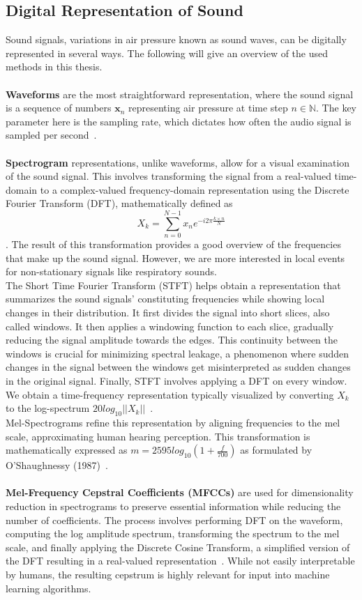 \subsection{Digital Representation of Sound}
Sound signals, variations in air pressure known as sound waves, can be digitally represented in several ways. The following will give an overview of the used methods in this thesis.\\\\
\textbf{Waveforms} are the most straightforward representation, where the sound signal is a sequence of numbers $\mathbf{x}_n$ representing air pressure at time step $n\in \mathbb{N}$. The key parameter here is the sampling rate, which dictates how often the audio signal is sampled per second~\cite{backstrom2020introduction}.\\\\
\textbf{Spectrogram} representations, unlike waveforms, allow for a visual examination of the sound signal. This involves transforming the signal from a real-valued time-domain to a complex-valued frequency-domain representation using the Discrete Fourier Transform (DFT), mathematically defined as \[ X_k=\sum_{n=0}^{N-1}x_ne^{-i2\pi\frac{k\times n}{N}} \]. The result of this transformation provides a good overview of the frequencies that make up the sound signal. However, we are more interested in local events for non-stationary signals like respiratory sounds.\\
The Short Time Fourier Transform (STFT) helps obtain a representation that summarizes the sound signals' constituting frequencies while showing local changes in their distribution. It first divides the signal into short slices, also called windows. It then applies a windowing function to each slice, gradually reducing the signal amplitude towards the edges. This continuity between the windows is crucial for minimizing spectral leakage, a phenomenon where sudden changes in the signal between the windows get misinterpreted as sudden changes in the original signal. Finally, STFT involves applying a DFT on every window. We obtain a time-frequency representation typically visualized by converting $X_k$ to the log-spectrum $20log_{10}||X_k||$~\cite{backstrom2020introduction}.\\
Mel-Spectrograms refine this representation by aligning frequencies to the mel scale, approximating human hearing perception. This transformation is mathematically expressed as $m=2595log_{10}\left(1+\frac{f}{700}\right)$ as formulated by O'Shaughnessy (1987)~\cite{o1987speech}.\\\\
\textbf{Mel-Frequency Cepstral Coefficients (MFCCs)} are used for dimensionality reduction in spectrograms to preserve essential information while reducing the number of coefficients. The process involves performing DFT on the waveform, computing the log amplitude spectrum, transforming the spectrum to the mel scale, and finally applying the Discrete Cosine Transform, a simplified version of the DFT resulting in a real-valued representation~\cite{backstrom2020introduction}. While not easily interpretable by humans, the resulting cepstrum is highly relevant for input into machine learning algorithms.

